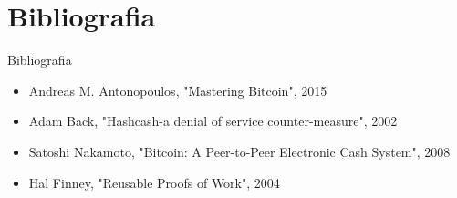 \section{Bibliografia}

\begin{frame}{Bibliografia} 
    \begin{itemize}
        \item Andreas M. Antonopoulos, "Mastering Bitcoin", 2015
        \item Adam Back, "Hashcash-a denial of service counter-measure", 2002
        \item Satoshi Nakamoto, "Bitcoin: A Peer-to-Peer Electronic Cash System", 2008
        \item Hal Finney, "Reusable Proofs of Work", 2004
    \end{itemize}
\end{frame}

